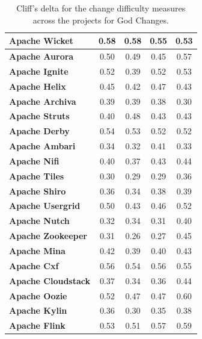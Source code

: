 {\begin{landscape}
\begin{table}[!htbp]
\begin{tabular}{l|c|c|c|c}
\textbf{Apache Wicket} & 0.58 & 0.58 & 0.55 & 0.53\\ \hline
\textbf{Apache Aurora} & 0.50 & 0.49 & 0.45 & 0.57\\ \hline
\textbf{Apache Ignite} & 0.52 & 0.39 & 0.52 & 0.53\\ \hline
\textbf{Apache Helix} & 0.45 & 0.42 & 0.47 & 0.43\\ \hline
\textbf{Apache Archiva} & 0.39 & 0.39 & 0.38 & 0.30\\ \hline
\textbf{Apache Struts} & 0.40 & 0.48 & 0.43 & 0.43\\ \hline
\textbf{Apache Derby} & 0.54 & 0.53 & 0.52 & 0.52\\ \hline
\textbf{Apache Ambari} & 0.34 & 0.32 & 0.41 & 0.33\\ \hline
\textbf{Apache Nifi} & 0.40 & 0.37 & 0.43 & 0.44\\ \hline
\textbf{Apache Tiles} & 0.30 & 0.29 & 0.29 & 0.36\\ \hline
\textbf{Apache Shiro} & 0.36 & 0.34 & 0.38 & 0.39\\ \hline
\textbf{Apache Usergrid} & 0.50 & 0.43 & 0.46 & 0.52\\ \hline
\textbf{Apache Nutch} & 0.32 & 0.34 & 0.31 & 0.40\\ \hline
\textbf{Apache Zookeeper} & 0.31 & 0.26 & 0.27 & 0.45\\ \hline
\textbf{Apache Mina} & 0.42 & 0.39 & 0.40 & 0.43\\ \hline
\textbf{Apache Cxf} & 0.56 & 0.54 & 0.56 & 0.55\\ \hline
\textbf{Apache Cloudstack} & 0.37 & 0.34 & 0.36 & 0.44\\ \hline
\textbf{Apache Oozie} & 0.52 & 0.47 & 0.47 & 0.60\\ \hline
\textbf{Apache Kylin} & 0.36 & 0.30 & 0.35 & 0.38\\ \hline
\textbf{Apache Flink} & 0.53 & 0.51 & 0.57 & 0.59\\ \hline



	\end{tabular}
		\caption{Cliff's delta for the change difficulty measures across the projects for God Changes.}
		\label{table:cliff_deltas_RQ4_God}
\end{table}
\end{landscape}


\begin{landscape}
	\begin{table}[!htbp]
		
		\small
		\centering
		

\end{table}
\end{landscape}}
